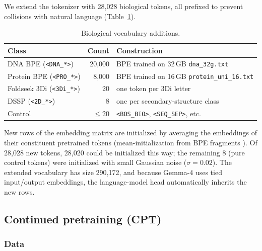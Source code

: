 \documentclass[11pt]{article}
\begin{document}
We extend the tokenizer with 28{,}028 biological tokens, all prefixed to prevent collisions with natural language (Table~\ref{tab:vocab}).

\begin{table}[H]
\centering
\small
\caption{Biological vocabulary additions.}
\label{tab:vocab}
\begin{tabular}{lrl}
\toprule
\textbf{Class} & \textbf{Count} & \textbf{Construction} \\
\midrule
DNA BPE (\texttt{<DNA\_*>})   & 20{,}000 & BPE \citep{sennrich2016bpe} trained on 32\,GB \texttt{dna\_32g.txt} \\
Protein BPE (\texttt{<PRO\_*>}) &  8{,}000 & BPE trained on 16\,GB \texttt{protein\_uni\_16.txt} \\
Foldseek 3Di (\texttt{<3Di\_*>})  &     20 & one token per 3Di letter \citep{vankempen2024foldseek} \\
DSSP (\texttt{<2D\_*>})        &      8 & one per secondary-structure class \citep{kabsch1983dssp} \\
Control                      & $\leq 20$ & \texttt{<BOS\_BIO>}, \texttt{<SEQ\_SEP>}, etc. \\
\bottomrule
\end{tabular}
\end{table}

New rows of the embedding matrix are initialized by averaging the embeddings of their constituent pretrained tokens (mean-initialization from BPE fragments \citep{kim2024vocabexpansion, tao2024lvm}). Of 28{,}028 new tokens, 28{,}020 could be initialized this way; the remaining 8 (pure control tokens) were initialized with small Gaussian noise ($\sigma = 0.02$). The extended vocabulary has size 290{,}172, and because Gemma-4 uses tied input/output embeddings, the language-model head automatically inherits the new rows.

\subsection{Continued pretraining (CPT)}

\subsubsection{Data}
\end{document}
